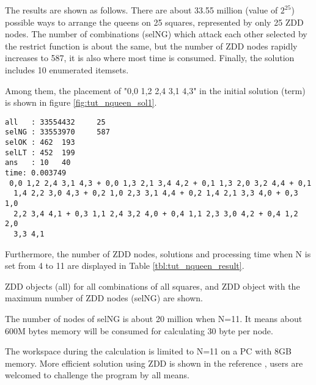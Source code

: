 The results are shown as follows. 
There are about  33.55 million (value of $2^25$) possible ways to arrange the queens on 25 squares, represented by only 25 ZDD nodes.  
The number of combinations (selNG) which attack each other selected by the restrict function is about the same, but the number of ZDD nodes rapidly increases to 587, it is also where most time is consumed. 
Finally, the solution includes 10 enumerated itemsets.

Among them, the placement of "0,0 1,2 2,4 3,1 4,3" in the initial solution (term) is shown in figure \ref{fig:tut_nqueen_sol1}.

\begin{Verbatim}[baselinestretch=0.7,frame=single]
all   : 33554432	 25
selNG : 33553970	 587
selOK : 462	 193
selLT : 452	 199
ans   : 10	 40
time: 0.003749
 0,0 1,2 2,4 3,1 4,3 + 0,0 1,3 2,1 3,4 4,2 + 0,1 1,3 2,0 3,2 4,4 + 0,1
  1,4 2,2 3,0 4,3 + 0,2 1,0 2,3 3,1 4,4 + 0,2 1,4 2,1 3,3 4,0 + 0,3 1,0
  2,2 3,4 4,1 + 0,3 1,1 2,4 3,2 4,0 + 0,4 1,1 2,3 3,0 4,2 + 0,4 1,2 2,0
  3,3 4,1
\end{Verbatim}

Furthermore, the number of ZDD nodes, solutions and processing time when N is set from 4 to 11 are displayed in Table \ref{tbl:tut_nqueen_result}.

ZDD objects (all) for all combinations of all squares, and ZDD object with the maximum number of ZDD nodes (selNG) are shown.  
 
The number of nodes of selNG is about 20 million when N=11. It means about 600M bytes memory will be consumed for calculating 30 byte per node.

The workspace during the calculation is limited to N=11 on a PC with 8GB memory.  More efficient solution using ZDD is shown in the reference \cite{okumura1995}, users are welcomed to challenge the program by all means.

